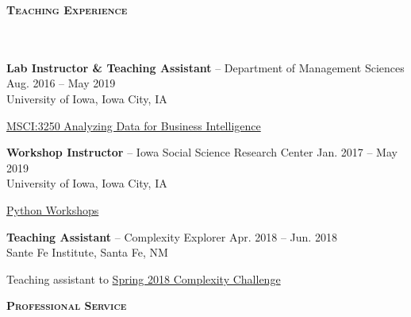 \documentclass{article}
\newcommand{\header}[1]{{
\hspace*{-15pt}\vspace*{6pt} \textbf{\textsc{\large{#1}}}} \vspace*{-6pt} 
\lineunder
}
\newcommand{\lineunder}{
\vspace*{-8pt} \\ \hspace*{-15pt} 
\hrulefill \\
}
\newcommand{\employer}[4]{{
\vspace*{2pt}%
\textbf{#1} #2 \hfill #3\\ #4 \vspace*{2pt}}
}
\renewcommand{\labelitemii}{
$\vcenter{\hbox{\tiny$\bullet$}}$\hspace*{-3pt}
}
\newenvironment{bullet-list-minor}{
\begin{list}{\labelitemii}{\setlength\leftmargin{15pt} 
\topsep 0pt \itemsep -2pt}}{\vspace*{4pt}\end{list}
}
\begin{document}
\vspace*{4pt}
\header{Teaching Experience}
    \employer{Lab Instructor \& Teaching Assistant}{-- Department of Management Sciences}{Aug. 2016 -- May 2019}{University of Iowa, Iowa City, IA}
	\begin{bullet-list-minor}
        \item {\href{https://myui.uiowa.edu/my-ui/courses/dashboard.page?q.courseSubject=MSCI&q.courseNumber=3250&showResults=1}{MSCI:3250 Analyzing Data for Business Intelligence}}
    \end{bullet-list-minor}
    
    \employer{Workshop Instructor}{-- Iowa Social Science Research Center}{Jan. 2017 -- May 2019}{University of Iowa, Iowa City, IA}
	\begin{bullet-list-minor}
        \item \href{https://github.com/zhiyzuo/python-tutorial}{Python Workshops}
    \end{bullet-list-minor}
    
    \employer{Teaching Assistant}{-- Complexity Explorer}{Apr. 2018 -- Jun. 2018}{Sante Fe Institute, Santa Fe, NM}
	\begin{bullet-list-minor}
        \item Teaching assistant to \href{https://www.complexityexplorer.org/challenges/2-spring-2018-complexity-challenge}{Spring 2018 Complexity Challenge}
    \end{bullet-list-minor}
    

\vspace*{4pt}
\header{Professional Service}
\end{document}
